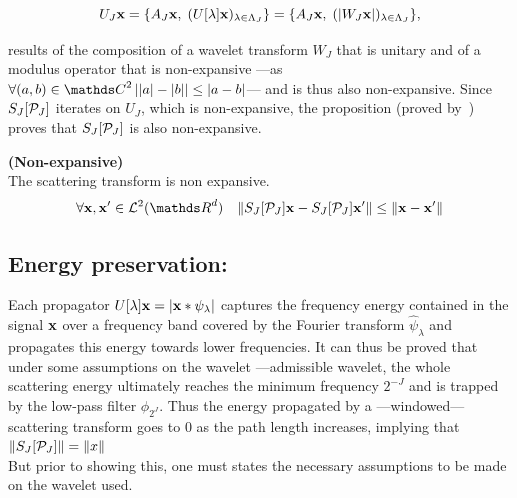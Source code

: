 \documentclass[a4paper,11pt]{report}
\begin{document}
			\begin{equation*}
			  U_{J} {\bf x} = \{ A_{J}{\bf x} , \; (U[\lambda]{\bf x})_{\lambda \in \Lambda_{J}} \} = \{ A_{J}{\bf x} , \; (\left| W_{J}{\bf x} \right|)_{\lambda \in \Lambda_{J}} \},
				\label{eq:One step propagator 2}
			\end{equation*}

			results of the composition of a wavelet transform $W_{J}$ that is unitary and of a modulus operator that is non-expansive ---as $\forall (a,b) \in \dsC^{2} \abs{\abs{a}-\abs{b}} \leq \abs{a-b}$--- and is thus also non-expansive. Since $S_{J}[\mathcal{P}_{J}]$ iterates on $U_{J}$, which is non-expansive, the proposition (proved by~\citep{lohmiller1998contraction}) proves that $S_{J}[\mathcal{P}_{J}]$ is also non-expansive.
			
			\begin{prop} \textbf{(Non-expansive)}\\ 
				The scattering transform is non expansive.
				\begin{equation}
				  \forall \bfx,\bfx' \in \mcalL^{2}(\dsR^{d}) \;\;\; \norm{S_{J}[\mcalP_{J}]\bfx - S_{J}[\mcalP_{J}]\bfx'} \leq \norm{\bfx-\bfx'}
  			  \label{eq:Nonexpansivity}
				\end{equation}
			  \label{pty:Nonexpansivity}
			\end{prop}

		\subsection{Energy preservation:}
			\label{subsec:ST/Pties/Energy}
			Each propagator $U[\lambda]{\bf x} = \left| {\bf x} \ast \psi_{\lambda} \right|$ captures the frequency energy contained in the signal ${\bf x}$ over a frequency band covered by the Fourier transform $\hat{\psi}_{\lambda}$ and propagates this energy towards lower frequencies. It can thus be proved that under some assumptions on the wavelet ---admissible wavelet, the whole scattering energy ultimately reaches the minimum frequency $2^{-J}$ and is trapped by the low-pass filter $\phi_{2^{J}}$. Thus the energy propagated by a ---windowed--- scattering transform goes to $0$ as the path length increases, implying that $\left\lVert S_{J}[\mathcal{P}_{J}] \right\rVert = \left\lVert x \right\rVert$\\
			
			But prior to showing this, one must states the necessary assumptions to be made on the wavelet used.
						
\end{document}
